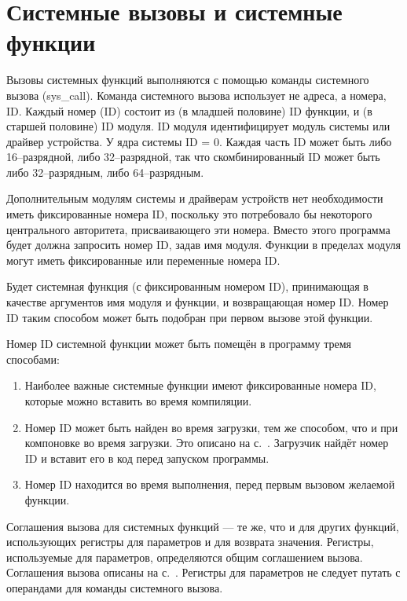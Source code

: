 \documentclass[forwardcom.tex]{subfiles}
\begin{document}
\section{Системные вызовы и системные функции} \label{systemCallIDSystem}
Вызовы системных функций выполняются с помощью команды системного вызова (sys\_call). Команда системного вызова использует не адреса, а номера, ID. Каждый номер (ID) состоит из (в младшей половине) ID функции, и (в старшей половине) ID модуля. ID модуля идентифицирует модуль системы или драйвер устройства. У ядра системы ID = 0. Каждая часть ID может быть либо 16--разрядной, либо 32--разрядной, так что скомбинированный ID может быть либо 32--разрядным, либо 64--разрядным.

Дополнительным модулям системы и драйверам устройств нет необходимости иметь фиксированные номера ID, поскольку это потребовало бы некоторого центрального авторитета, присваивающего эти номера. Вместо этого программа будет должна запросить номер ID, задав имя модуля. Функции в пределах модуля могут иметь фиксированные или переменные номера ID.

Будет системная функция (с фиксированным номером ID), принимающая в качестве аргументов имя модуля и функции, и возвращающая номер ID. Номер ID  таким способом может быть подобран при первом вызове этой функции.

Номер ID системной функции может быть помещён в программу тремя способами:
\begin{enumerate}
\item Наиболее важные системные функции имеют фиксированные номера ID, которые можно вставить во время компиляции.

\item Номер ID может быть найден во время загрузки, тем же способом, что и при компоновке во время загрузки. Это описано на с.~\pageref{loadTimeLinking}. Загрузчик найдёт номер ID и вставит его в код перед запуском программы.

\item Номер ID находится во время выполнения, перед первым вызовом желаемой функции. 
\end{enumerate}

Соглашения вызова для системных функций --- те же, что и для других функций, использующих регистры для параметров и для возврата значения. Регистры, используемые для параметров, определяются общим соглашением вызова. Соглашения вызова описаны на с.~\pageref{functionCallingConventions}. Регистры для параметров не следует путать с операндами для команды системного вызова.
\end{document}
